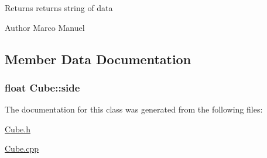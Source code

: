 \begin{DoxyReturn}{Returns}
returns string of data
\end{DoxyReturn}
\begin{DoxyAuthor}{Author}
Marco Manuel 
\end{DoxyAuthor}


\subsection{Member Data Documentation}
\subsubsection[{\texorpdfstring{side}{side}}]{\setlength{\rightskip}{0pt plus 5cm}float Cube\+::side\hspace{0.3cm}{\ttfamily [private]}}\hypertarget{classCube_a2fd970f59cab380889a60c60e5b76593}{}\label{classCube_a2fd970f59cab380889a60c60e5b76593}


The documentation for this class was generated from the following files\+:\begin{DoxyCompactItemize}
\item 
\hyperlink{Cube_8h}{Cube.\+h}\item 
\hyperlink{Cube_8cpp}{Cube.\+cpp}\end{DoxyCompactItemize}

